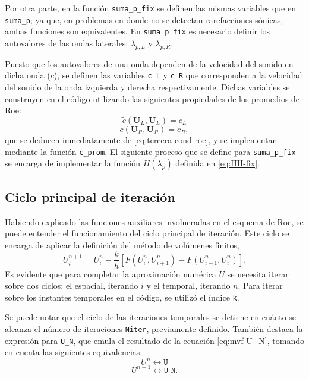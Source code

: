 Por otra parte, en la función \texttt{suma\_p\_fix} se definen las mismas variables que en \texttt{suma\_p}; ya que, en problemas en donde no se detectan rarefacciones sónicas, ambas funciones son equivalentes. En \texttt{suma\_p\_fix} es necesario definir los autovalores de las ondas laterales: $\lambda_{p,L}$ y $\lambda_{p,R}$.

Puesto que los autovalores de una onda dependen de la velocidad del sonido en dicha onda ($c$), se definen las variables \texttt{c\_L} y \texttt{c\_R} que corresponden a la velocidad del sonido de la onda izquierda y derecha respectivamente. Dichas variables se construyen en el código utilizando las siguientes propiedades de los promedios de Roe:
\begin{equation}
	\tilde{c}(\mathbf{{U}}_L, \mathbf{{U}}_L) = c_L
\end{equation}
\begin{equation}
	\tilde{c}(\mathbf{{U}}_R, \mathbf{{U}}_R) = c_R,
\end{equation}
que se deducen inmediatamente de \eqref{eq:tercera-cond-roe}, y se implementan mediante la función \texttt{c\_prom}. El siguiente proceso que se define para \texttt{suma\_p\_fix} se encarga de implementar la función $H(\lambda_{p})$ definida en \eqref{eq:HH-fix}.


\subsection{Ciclo principal de iteración}
Habiendo explicado las funciones auxiliares involucradas en el esquema de Roe, se puede entender el funcionamiento del ciclo principal de iteración. Este ciclo se encarga de aplicar la definición del método de volúmenes finitos,
\begin{equation}
	U_{i}^{n+1} = U_{i}^{n} -
	\frac{k}{h}\left[ F(U_{i}^n, U_{i+1}^n) - F(U_{i-1}^n, U_i^n)\right].
	\label{eq:mvf-U_N}
\end{equation}
Es evidente que para completar la aproximación numérica $U$ se necesita iterar sobre dos ciclos: el espacial, iterando $i$ y el temporal, iterando $n$. Para iterar sobre los instantes temporales en el código, se utilizó el índice \texttt{k}.

Se puede notar que el ciclo de las iteraciones temporales se detiene en cuánto se alcanza el número de iteraciones \texttt{Niter}, previamente definido. También destaca la expresión para \texttt{U\_N}, que emula el resultado de la ecuación \eqref{eq:mvf-U_N}, tomando en cuenta las siguientes equivalencias:
\begin{equation}
	U^{n} \leftrightarrow \texttt{U}
\end{equation}
\begin{equation}
	U^{n+1} \leftrightarrow \texttt{U\_N}.
\end{equation}

